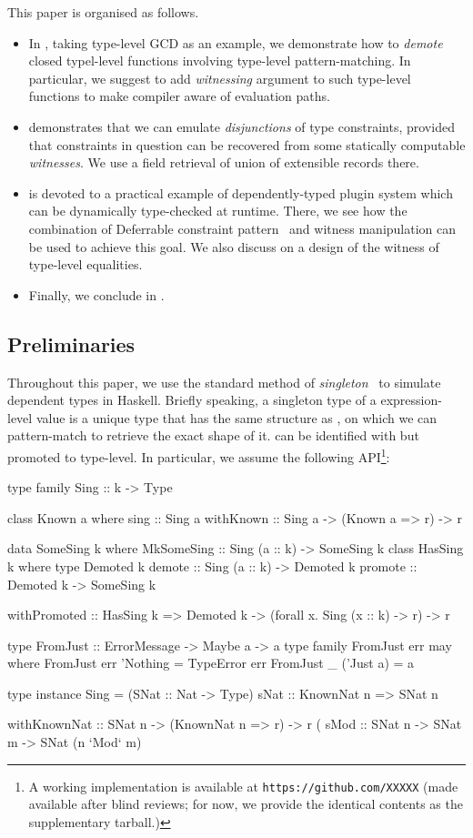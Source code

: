 \documentclass[demotion-paper.tex]{subfiles}
\begin{document}
This paper is organised as follows.
\begin{itemize}
  \item In , taking type-level GCD as an example, we demonstrate how to \emph{demote} closed typel-level functions involving type-level pattern-matching.
  In particular, we suggest to add \emph{witnessing} argument to such type-level functions to make compiler aware of evaluation paths.
  \item {} demonstrates that we can emulate \emph{disjunctions} of type constraints, provided that constraints in question can be recovered from some statically computable \emph{witnesses}.
  We use a field retrieval of union of extensible records there.
  \item {} is devoted to a practical example of dependently-typed plugin system which can be dynamically type-checked at runtime.
  There, we see how the combination of Deferrable constraint pattern~\cite{Kmett:2020ab} and witness manipulation can be used to achieve this goal.
  We also discuss on a design of the witness of type-level equalities.
  \item Finally, we conclude in .
\end{itemize}

\subsection{Preliminaries}
Throughout this paper, we use the standard method of \emph{singleton}~\cite{Eisenberg:2012} to simulate dependent types in Haskell.
Briefly speaking, a singleton type  of a expression-level value  is a unique type that has the same structure as , on which we can pattern-match to retrieve the exact shape of it.  can be identified with  but promoted to type-level.
In particular, we assume the following API\footnote{A working implementation is available at \texttt{https://github.com/XXXXX} (made available after blind reviews; for now, we provide the identical contents as the supplementary tarball.)}:

\begin{code}
type family Sing :: k -> Type

class Known a where
  sing :: Sing a
withKnown :: Sing a -> (Known a => r) -> r

data SomeSing k where
  MkSomeSing :: Sing (a :: k) -> SomeSing k
class HasSing k where
  type Demoted k 
  demote :: Sing (a :: k) -> Demoted k
  promote :: Demoted k -> SomeSing k

withPromoted :: HasSing k
  => Demoted k
  -> (forall x. Sing (x :: k) -> r) -> r

type FromJust :: ErrorMessage -> Maybe a -> a
type family FromJust err may where 
  FromJust err 'Nothing = TypeError err
  FromJust _ ('Just a)  = a

type instance Sing = (SNat :: Nat -> Type)
sNat :: KnownNat n => SNat n

withKnownNat :: SNat n -> (KnownNat n => r) -> r
(%
sMod :: SNat n -> SNat m -> SNat (n `Mod` m)
\end{code}
\end{document}
